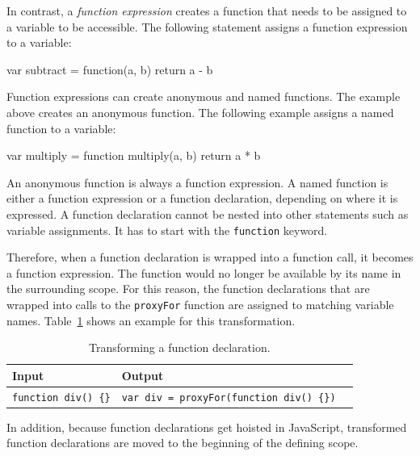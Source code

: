In contrast, a \emph{function expression} creates a function that needs to be assigned to a variable to be accessible.
The following statement assigns a function expression to a variable:

\begin{code}{}{}
var subtract = function(a, b) {return a - b}
\end{code}
\iffalse
\end{verbatim}\fi

Function expressions can create anonymous and named functions.
The example above creates an anonymous function.
The following example assigns a named function to a variable:

\begin{code}{}{}
var multiply = function multiply(a, b) {return a * b}
\end{code}
\iffalse
\end{verbatim}\fi

An anonymous function is always a function expression.
A named function is either a function expression or a function declaration, depending on where it is expressed.
A function declaration cannot be nested into other statements such as variable assignments.
It has to start with the \lstinline{function} keyword.

Therefore, when a function declaration is wrapped into a function call, it becomes a function expression.
The function would no longer be available by its name in the surrounding scope.
For this reason, the function declarations that are wrapped into calls to the \lstinline{proxyFor} function are assigned to matching variable names.
Table~\ref{table:funcTransform} shows an example for this transformation.

\begin{table}[h]
\begin{center}
\begin{tabular}{| l | l | l |}
\hline
Input & Output \\ \hline
\lstinline|function div() {}| & \lstinline|var div = proxyFor(function div() {})| \\ \hline
\end{tabular}
\end{center}
\caption[Table caption text]{Transforming a function declaration.}
\label{table:funcTransform}
\end{table}

In addition, because function declarations get hoisted in JavaScript, transformed function declarations are moved to the beginning of the defining scope.


